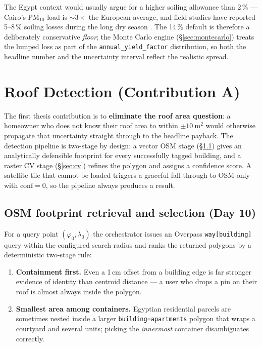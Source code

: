 The Egypt context would usually argue for a higher soiling allowance
than 2\,\% --- Cairo's $\mathrm{PM}_{10}$ load is ${\sim}3\times$ the
European average, and field studies have reported 5--8\,\% soiling
losses during the long dry season \citep{elsayed2017}. The 14\,\%
default is therefore a deliberately conservative \emph{floor}; the
Monte Carlo engine (\S\ref{sec:montecarlo}) treats the lumped loss as
part of the \texttt{annual\_yield\_factor} distribution, so both the
headline number and the uncertainty interval reflect the realistic
spread.

\section{Roof Detection (Contribution A)}
\label{sec:roof}

The first thesis contribution is to \textbf{eliminate the roof area
question}: a homeowner who does not know their roof area to within
$\pm 10~\mathrm{m^{2}}$ would otherwise propagate that uncertainty
straight through to the headline payback. The detection pipeline is
two-stage by design: a vector OSM stage (\S\ref{sec:osm}) gives an
analytically defensible footprint for every successfully tagged
building, and a raster CV stage (\S\ref{sec:cv}) refines the polygon
and assigns a confidence score. A satellite tile that cannot be
loaded triggers a graceful fall-through to OSM-only with
$\text{conf}=0$, so the pipeline always produces a result.

\subsection{OSM footprint retrieval and selection (Day 10)}
\label{sec:osm}

For a query point $(\varphi_0, \lambda_0)$ the orchestrator issues an
Overpass \texttt{way[building]} query within the configured search
radius and ranks the returned polygons by a deterministic two-stage
rule:

\begin{enumerate}[leftmargin=*]
\item \textbf{Containment first.} Even a 1\,cm offset from a building
edge is far stronger evidence of identity than centroid distance ---
a user who drops a pin on their roof is almost always inside the
polygon.
\item \textbf{Smallest area among containers.} Egyptian residential
parcels are sometimes nested inside a larger
\texttt{building=apartments} polygon that wraps a courtyard and
several units; picking the \emph{innermost} container disambiguates
correctly.
\end{enumerate}

